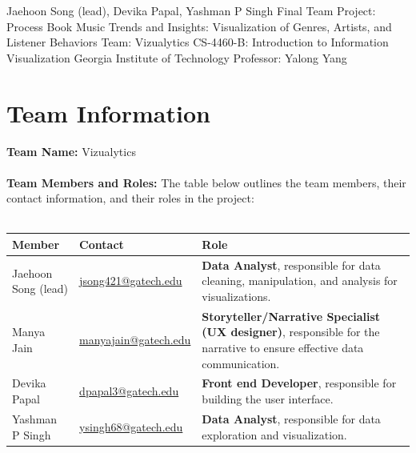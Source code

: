 \documentclass[12pt]{article}
\begin{document}
\convertarraytostring
{\titleauthors}                                                                       %
{Jaehoon Song (lead), Devika Papal, Yashman P Singh}
\customtitle
{Final Team Project: Process Book}                                                    %
{Music Trends and Insights: Visualization of Genres, Artists, and Listener Behaviors} %
{Team: Vizualytics}                                                                   %
{\titleauthors}
{CS-4460-B: Introduction to Information Visualization}                                %
{Georgia Institute of Technology}                                                     %
{Professor: Yalong Yang}                                                              %



\section*{Team Information}
\textbf{Team Name:} Vizualytics \\ \\
\textbf{Team Members and Roles:} The table below outlines the team members, their contact information, and their roles in the project: \\ \\
{\centering
    \begin{tabular}{| p{120pt} | p{180pt} | p{220pt} |} 
    \hline
    \textbf{Member} & \textbf{Contact} & \textbf{Role} \\
    \hline
    Jaehoon Song (lead) & \href{mailto:jsong421@gatech.edu}{jsong421@gatech.edu} & \textbf{Data Analyst}, responsible for data cleaning, manipulation, and analysis for visualizations. \\
    \hline
    Manya Jain & \href{mailto:manyajain@gatech.edu}{manyajain@gatech.edu} & \textbf{Storyteller/Narrative Specialist (UX designer)}, responsible for the narrative to ensure effective data communication. \\
    \hline
    Devika Papal & \href{mailto:dpapal3@gatech.edu}{dpapal3@gatech.edu} & \textbf{Front end Developer}, responsible for building the user interface. \\
    \hline
    Yashman P Singh & \href{mailto:ysingh68@gatech.edu}{ysingh68@gatech.edu} & \textbf{Data Analyst}, responsible for data exploration and visualization. \\
    \hline
    \end{tabular}
}
\newpage
\end{document}

